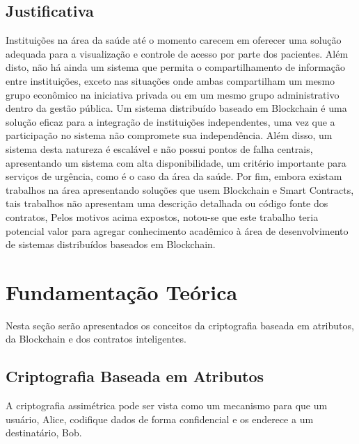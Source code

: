 \documentclass[a4paper,11pt]{article}
\begin{document}
\subsection{Justificativa}

Instituições na área da saúde até o momento carecem em oferecer uma solução adequada para a visualização e controle de acesso por parte dos pacientes.
Além disto, não há ainda um sistema que permita o compartilhamento de informação entre instituições, exceto nas situações onde ambas compartilham um mesmo grupo econômico na iniciativa privada ou em um mesmo grupo administrativo dentro da gestão pública.
Um sistema distribuído baseado em Blockchain é uma solução eficaz para a integração de instituições independentes, uma vez que a participação no sistema não compromete sua independência.
Além disso, um sistema desta natureza é escalável e não possui pontos de falha centrais, apresentando um sistema com alta disponibilidade, um critério importante para serviços de urgência, como é o caso da área da saúde.
Por fim, embora existam trabalhos na área apresentando soluções que usem Blockchain e Smart Contracts, tais trabalhos não apresentam uma descrição detalhada ou código fonte dos contratos,
Pelos motivos acima expostos, notou-se que este trabalho teria potencial valor para agregar conhecimento acadêmico à área de desenvolvimento de sistemas distribuídos baseados em Blockchain.

\newpage
\section{Fundamentação Teórica}

Nesta seção serão apresentados os conceitos da criptografia baseada em atributos, da Blockchain e dos contratos inteligentes.

\subsection{Criptografia Baseada em Atributos} \label{sec:sub:abe}


A criptografia assimétrica pode ser vista como um mecanismo para que um usuário, Alice, codifique dados de forma confidencial e os enderece a um destinatário, Bob.
\end{document}
